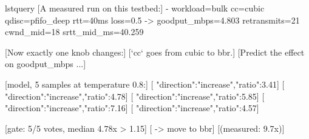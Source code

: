 \documentclass[border=1pt]{standalone}
\newcommand{\lstgray}[1]{\textcolor{palGray}{#1}}
\newcommand{\lstplum}[1]{\textcolor{palPlum}{#1}}
\newcommand{\lstblue}[1]{\textcolor{palBlue}{#1}}
\newcommand{\lstteal}[1]{\textcolor{palTeal}{#1}}
\begin{document}
\begin{SaveVerbatim}[commandchars=\\\[\]]{lstquery}
\lstgray[A measured run on this testbed:]
- workload=bulk cc=cubic qdisc=pfifo_deep
  rtt=40ms loss=0.5%
  -> goodput_mbps=4.803 retransmits=21
     cwnd_mid=18 srtt_mid_ms=40.259

\lstplum[Now exactly one knob changes:]
\lstplum[`cc` goes from cubic to bbr.]
\lstplum[Predict the effect on goodput_mbps ...]

\lstgray[model, 5 samples at temperature 0.8:]
\lstblue[ {"direction":"increase","ratio":3.41}]
\lstblue[ {"direction":"increase","ratio":4.78}]
\lstblue[ {"direction":"increase","ratio":5.85}]
\lstblue[ {"direction":"increase","ratio":7.16}]
\lstblue[ {"direction":"increase","ratio":4.57}]

\lstteal[gate: 5/5 votes, median 4.78x > 1.15]
\lstteal[ -> move to bbr]   \lstgray[(measured: 9.7x)]
\end{SaveVerbatim}
\begin{tcolorbox}[colback=palBlue!4!white, colframe=palBlue,
  boxrule=0.4pt, leftrule=2.5pt, arc=1.5pt, left=4pt, right=2pt,
  top=3pt, bottom=3pt, width=8.45cm]
\footnotesize{}
\end{tcolorbox}
\end{document}
